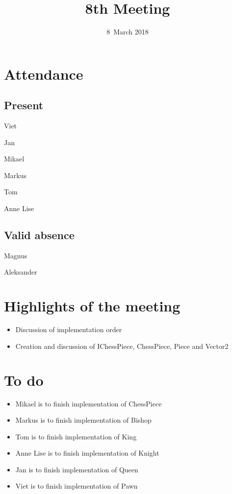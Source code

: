\documentclass[letterpaper,11pt]{article}
\title{8th Meeting}
\date{8~March 2018}
\begin{document}
\maketitle
\section*{Attendance}
\subsection*{Present}
\begin{list}{}{}
	\item Viet
	\item Jan
	\item Mikael
	\item Markus
	\item Tom
	\item Anne Lise
\end{list}
\subsection*{Valid absence}
\begin{list}{}{}
	\item Magnus
	\item Aleksander
\end{list}

\newpage
\section*{Highlights of the meeting}
\begin{itemize}
	\item Discussion of implementation order
	\item Creation and discussion of IChessPiece, ChessPiece, Piece and Vector2
\end{itemize}

\section*{To do}
\begin{itemize}
	\item Mikael is to finish implementation of ChessPiece
	\item Markus is to finish implementation of Bishop
	\item Tom is to finish implementation of King
	\item Anne Lise is to finish implementation of Knight
	\item Jan is to finish implementation of Queen
	\item Viet is to finish implementation of Pawn
\end{itemize}
\end{document}
